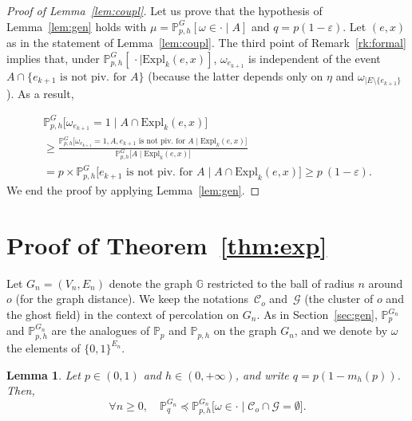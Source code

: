 \documentclass[10pt]{amsart}
\newtheorem{lemm}[theo]{Lemma}
\theoremstyle{definition}
\renewcommand{\pagebreak}[1][4]{}
\newcommand{\G}{\mathbb{G}}
\newcommand{\Pro}{\mathbb{P}}
\newcommand{\calC}{\mathcal{C}}
\newcommand{\calG}{\mathcal{G}}
\newcommand{\Expl}{\mathrm{Expl}}
\let\oldforall\forall
\renewcommand*{\forall}{\mathrel{\oldforall}}
\begin{document}
\begin{proof}[Proof of Lemma~\ref{lem:coupl}]
Let us prove that the hypothesis of Lemma~\ref{lem:gen} holds with $\mu=\Pro_{p,h}^G[\omega \in \cdot \mid A]$ and $q=p(1-\varepsilon)$. Let $(e,x)$ as in the statement of Lemma~\ref{lem:coupl}. The third point of Remark~\ref{rk:formal} implies that, under $\Pro_{p,h}^G [\, \cdot \mid \Expl_k(e,x) ]$, $\omega_{e_{k+1}}$ is independent of the event $A \cap \{ \text{$e_{k+1} $ is not piv. for $A$} \}$ (because the latter depends only on $\eta$ and $\omega_{|E\setminus\{e_{k+1}\}}$). As a result,
\pagebreak
\begin{multline*}
\Pro_{p,h}^G \big[\omega_{e_{k+1}} = 1 \; \big| \; A \cap \Expl_k(e,x) \big]\\
\ge \frac{\Pro_{p,h}^G \big[\omega_{e_{k+1}} = 1, A, \text{$e_{k+1} $ is not piv. for $A$} \; \big| \; \Expl_k(e,x) \big]}{\Pro_{p,h}^G \big[A \; \big| \; \Expl_k(e,x) \big]}\\
= p \times\Pro_{p,h}^G \big[\text{$e_{k+1} $ is not piv. for $A$} \; \big| \; A \cap \Expl_k(e,x) \big]\ge p~(1-\varepsilon).
\end{multline*}
We end the proof by applying Lemma~\ref{lem:gen}.
\end{proof}

\section{Proof of Theorem~\ref{thm:exp}}\label{sec:proof}

Let $G_n=(V_n,E_n)$ denote the graph $\G$ restricted to the ball of radius $n$ around~$o$ (for the graph distance). We keep the notations~$\calC_o$ and~$\calG$ (the cluster of $o$ and the ghost field) in the context of percolation on $G_n$. As in Section~\ref{sec:gen}, $\Pro_{p}^{G_n}$ and $\Pro_{p,h}^{G_n}$ are the analogues of $\Pro_p$ and $\Pro_{p,h}$ on the graph $G_n$, and we denote by $\omega$ the elements of $\{0,1\}^{E_n}$.

\begin{lemm}\label{lem:coupl_perco}
Let $p \in (0,1)$ and $h \in (0,+\infty)$, and write $q=p(1-m_h(p))$. Then,
\[
\forall n \ge 0, \quad \Pro_{q}^{G_n} \preceq \Pro_{p,h}^{G_n} \big[\omega \in \cdot \; \big| \; \calC_o \cap \calG = \emptyset \big].
\]
\end{lemm}
\end{document}
